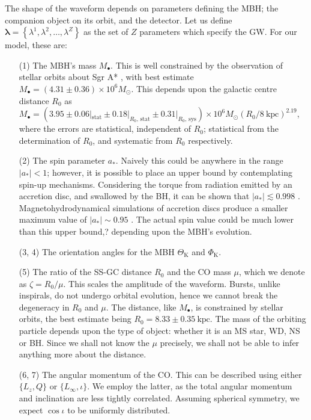 \documentclass[useAMS,usedcolumn,usegraphicx,usenatbib]{mn2e}
\newcommand{\units}[1]{\ensuremath{~\mathrm{#1}}}
\newcommand{\sub}[1]{\ensuremath{_\mathrm{#1}}}
\begin{document}
The shape of the waveform depends on parameters defining the MBH; the companion object on its orbit, and the detector. Let us define $\boldsymbol{\lambda} = \left\{\lambda^1, \lambda^2, \ldots, \lambda^Z\right\}$ as the set of $Z$ parameters which specify the GW. For our model, these are:
\begin{enumerate}
\item[(1)] The MBH's mass $M_\bullet$. This is well constrained by the observation of stellar orbits about Sgr A* \citep{Ghez2008, Gillessen2009}, with best estimate $M_\bullet = (4.31 \pm 0.36) \times 10^6 M_\odot$. This depends upon the galactic centre distance $R_0$ as $M_\bullet = (3.95 \pm 0.06|\sub{stat} \pm 0.18|_{R_0, \, \mathrm{stat}} \pm  0.31|_{R_0, \, \mathrm{sys}}) \times 10^6 M_\odot (R_0 / 8\units{kpc})^{2.19}$, where the errors are statistical, independent of $R_0$; statistical from the determination of $R_0$, and systematic from $R_0$ respectively.
\item[(2)] The spin parameter $a_\ast$. Naively this could be anywhere in the range $|a_\ast| < 1$; however, it is possible to place an upper bound by contemplating spin-up mechanisms. Considering the torque from radiation emitted by an accretion disc, and swallowed by the BH, it can be shown that $|a_\ast| \lesssim 0.998$ \citep{Thorne1974}. Magnetohydrodynamical simulations of accretion discs produce a smaller maximum value of $|a_\ast| \sim 0.95$ \citep*{Gammie2004}. The actual spin value could be much lower than this upper bound,? depending upon the MBH's evolution.
\item[(3, 4)] The orientation angles for the MBH $\Theta\sub{K}$ and $\Phi\sub{K}$.
\item[(5)] The ratio of the SS-GC distance $R_0$ and the CO mass $\mu$, which we denote as $\zeta = R_0/\mu$. This scales the amplitude of the waveform. Bursts, unlike inspirals, do not undergo orbital evolution, hence we cannot break the degeneracy in $R_0$ and $\mu$. The distance, like $M_\bullet$, is constrained by stellar orbits, the best estimate being \citep{Gillessen2009} $R_0 = 8.33 \pm 0.35\units{kpc}$. The mass of the orbiting particle depends upon the type of object: whether it is an MS star, WD, NS or BH. Since we shall not know the $\mu$ precisely, we shall not be able to infer anything more about the distance.
\item[(6, 7)] The angular momentum of the CO. This can be described using either $\{L_z, Q\}$ or $\{L_\infty, \iota\}$. We employ the latter, as the total angular momentum and inclination are less tightly correlated. Assuming spherical symmetry, we expect $\cos \iota$ to be uniformly distributed.

\end{enumerate}
\end{document}
